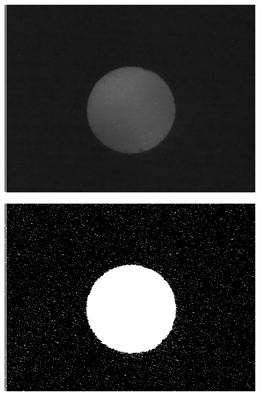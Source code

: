 \documentclass[12pt,a4paper]{report}
\begin{document}
\begin{figure}[!htbp]
    \centering
    \begin{minipage}{0.48\linewidth}
        \centering
        \includegraphics[width=\linewidth]{threshold-origin.png}
        \label{fig:thres-origin}
    \end{minipage} \hfill
    \begin{minipage}{0.48\linewidth}
        \centering
        \includegraphics[width=\linewidth]{graymean.png}
        \label{fig:graymean}
    \end{minipage} \\
    \begin{minipage}{0.48\linewidth}

\end{minipage}
\end{figure}
\end{document}
